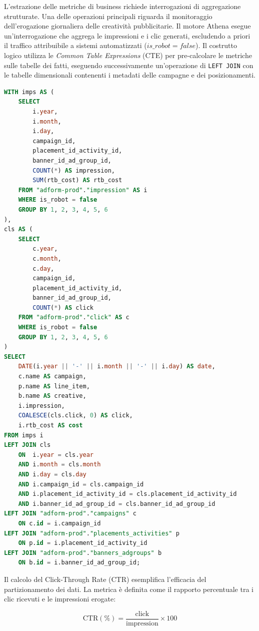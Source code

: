 L'estrazione delle metriche di business richiede interrogazioni di aggregazione strutturate. Una delle operazioni principali riguarda il monitoraggio dell'erogazione giornaliera delle creatività pubblicitarie. Il motore Athena esegue un'interrogazione che aggrega le impressioni e i clic generati, escludendo a priori il traffico attribuibile a sistemi automatizzati (\texttt{$is\_robot = false$}). Il costrutto logico utilizza le \emph{Common Table Expressions} (CTE) per pre-calcolare le metriche sulle tabelle dei fatti, eseguendo successivamente un'operazione di \texttt{LEFT JOIN} con le tabelle dimensionali contenenti i metadati delle campagne e dei posizionamenti.

\begin{lstlisting}[language=SQL, caption={Interrogazione analitica con CTE per l'aggregazione delle metriche di erogazione giornaliera}, label={lst:athena-daily-creatives}]
WITH imps AS (
    SELECT
        i.year,
        i.month,
        i.day,
        campaign_id,
        placement_id_activity_id,
        banner_id_ad_group_id,
        COUNT(*) AS impression,
        SUM(rtb_cost) AS rtb_cost
    FROM "adform-prod"."impression" AS i
    WHERE is_robot = false
    GROUP BY 1, 2, 3, 4, 5, 6
),
cls AS (
    SELECT
        c.year,
        c.month,
        c.day,
        campaign_id,
        placement_id_activity_id,
        banner_id_ad_group_id,
        COUNT(*) AS click
    FROM "adform-prod"."click" AS c
    WHERE is_robot = false
    GROUP BY 1, 2, 3, 4, 5, 6
)
SELECT
    DATE(i.year || '-' || i.month || '-' || i.day) AS date,
    c.name AS campaign,
    p.name AS line_item,
    b.name AS creative,
    i.impression,
    COALESCE(cls.click, 0) AS click,
    i.rtb_cost AS cost
FROM imps i
LEFT JOIN cls
    ON  i.year = cls.year
    AND i.month = cls.month
    AND i.day = cls.day
    AND i.campaign_id = cls.campaign_id
    AND i.placement_id_activity_id = cls.placement_id_activity_id
    AND i.banner_id_ad_group_id = cls.banner_id_ad_group_id
LEFT JOIN "adform-prod"."campaigns" c
    ON c.id = i.campaign_id
LEFT JOIN "adform-prod"."placements_activities" p
    ON p.id = i.placement_id_activity_id
LEFT JOIN "adform-prod"."banners_adgroups" b
    ON b.id = i.banner_id_ad_group_id;
\end{lstlisting}

Il calcolo del Click-Through Rate (CTR) esemplifica l'efficacia del partizionamento dei dati. La metrica è definita come il rapporto percentuale tra i clic ricevuti e le impressioni erogate:

\begin{equation}
\text{CTR} (\%) = \frac{\text{click}}{\text{impression}} \times 100
\label{eq:ctr_formula}
\end{equation}

